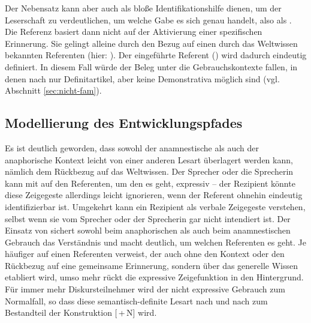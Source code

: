 \noindent 
Der Nebensatz kann aber auch als bloße Identifikationshilfe dienen, um der Leserschaft zu verdeutlichen, um welche Gabe es sich genau handelt, also als  \parencite[79]{Himmelmann1997}. Die Referenz basiert dann nicht auf der Aktivierung einer spezifischen Erinnerung. Sie gelingt alleine durch den Bezug auf einen durch das Weltwissen bekannten Referenten (hier: ). Der eingeführte Referent () wird dadurch eindeutig definiert.  In diesem Fall würde der Beleg unter die  Gebrauchskontexte fallen, in denen nach \textcite{Hawkins1978} nur Definitartikel, aber keine Demonstrativa möglich sind (vgl. Abschnitt \ref{sec:nicht-fam}). 

%
%

\subsection{Modellierung des Entwicklungspfades}\label{sec:disk-entwicklung}

Es ist deutlich geworden, dass sowohl der anamnestische als auch der anaphorische Kontext leicht von einer anderen Lesart überlagert werden kann, nämlich dem Rückbezug auf das Weltwissen. Der Sprecher oder die Sprecherin kann mit   auf den Referenten, um den es geht, expressiv  -- der Rezipient könnte diese Zeigegeste allerdings leicht ignorieren, wenn der Referent ohnehin eindeutig identifizierbar ist. Umgekehrt kann ein Rezipient  als verbale Zeigegeste verstehen, selbst wenn sie vom Sprecher oder der Sprecherin gar nicht intendiert ist.
Der Einsatz von  sichert sowohl beim anaphorischen als auch beim anamnestischen Gebrauch das Verständnis und macht deutlich, um welchen Referenten es geht. Je häufiger  auf einen Referenten verweist, der auch ohne den Kontext oder den Rückbezug auf eine gemeinsame Erinnerung, sondern über das generelle Wissen etabliert wird, umso mehr rückt die expressive Zeigefunktion in den Hintergrund. Für immer mehr Diskursteilnehmer wird der nicht expressive Gebrauch zum Normalfall, so dass diese semantisch-definite Lesart nach und nach zum Bestandteil der Konstruktion [\,+\,N] wird. 

